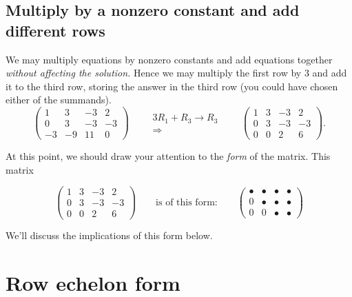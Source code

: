 \documentclass{ximera}
\begin{document}
\begin{question}
\end{question}

  
\subsection{Multiply by a nonzero constant and add different rows} 
We may multiply equations by nonzero constants and add equations together
\emph{without affecting the solution.} Hence we may multiply the first
row by $3$ and add it to the third row, storing the answer in the
third row (you could have chosen either of the summands).
\[
\left(\begin{array}{ccc|c}
  1 &   3 & -3 & 2  \\
  0 &   3 & -3 & -3 \\
  -3& -9  & 11 & 0
\end{array}\right)
\qquad
\begin{array}{c}
  3R_1+R_3\rightarrow R_3\\\Longrightarrow
\end{array}
\qquad
\left(\begin{array}{ccc|c}
  1 &   3 & -3 & 2  \\
  0 &   3 & -3 & -3 \\
  0& 0  & 2 & 6
\end{array}\right).
\]

\begin{question}
\end{question}



At this point, we should draw your attention to the \emph{form} of the matrix. This matrix

\[
\begin{pmatrix}
  1 &   3 & -3 & 2  \\
  0 &   3 & -3 & -3 \\
  0& 0  & 2 & 6
\end{pmatrix}
\qquad
\text{is of this form:}
\qquad
\begin{pmatrix}
  \bullet & \bullet & \bullet & \bullet \\
     0   & \bullet & \bullet & \bullet \\
     0  &    0 & \bullet & \bullet 
\end{pmatrix}
\]



We'll discuss the implications of this form below.


\section{Row echelon form}
\end{document}
